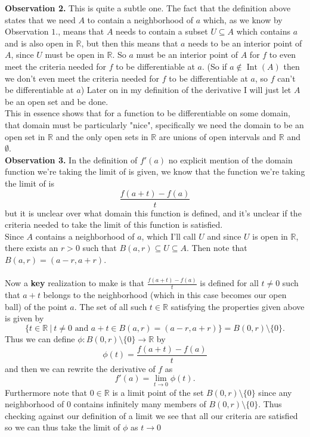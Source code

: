 \documentclass[12pt]{article}
\theoremstyle{definition}
\numberwithin{theorem}{subsection}
\numberwithin{corollary}{subsection}
\theoremstyle{remark}
\theoremstyle{point}
\begin{document}
	\textbf{Observation 2.} This is quite a subtle one. The fact that the definition above states that we need $A$ to contain a neighborhood of $a$ which, as we know by Observation $1.$, means that $A$ needs to contain a subset $U \subseteq A$ which contains $a$ and is also open in $\mathbb{R}$, but then this means that $a$ needs to be an interior point of $A$, since $U$ must be open in $\mathbb{R}$. So $a$ must be an interior point of $A$ for $f$ to even meet the criteria needed for $f$ to be differentiable at $a$. (So if $a\not\in \operatorname{Int}(A)$ then we don't even meet the criteria needed for $f$ to be differentiable at $a$, so $f$ can't be differentiable at $a$) Later on in my definition of the derivative I will just let $A$ be an open set and be done. \\
	
	This in essence shows that for a function to be differentiable on some domain, that domain must be particularly "nice", specifically we need the domain to be an open set in $\mathbb{R}$ and the only open sets in $\mathbb{R}$ are unions of open intervals and $\mathbb{R}$ and $\emptyset$. \\ 
		
	\textbf{Observation 3.} In the definition of $f'(a)$ no explicit mention of the domain function we're taking the limit of is given, we know that the function we're taking the limit of is $$\frac{f(a+t) - f(a)}{t}$$ but it is unclear over what domain this function is defined, and it's unclear if the criteria needed to take the limit of this function is satisfied. \\
	
	Since $A$ contains a neighborhood of $a$, which I'll call $U$ and since $U$ is open in $\mathbb{R}$, there exists an $r > 0$ such that $B(a, r) \subseteq U \subseteq A$.  Then note that $B(a, r) = (a-r, a+r)$. \\ \\ Now a \textbf{key} realization to make is that $\frac{f(a+t) - f(a)}{t}$ is defined for all $t \neq 0$ such that $a + t$ belongs to the neighborhood (which in this case becomes our open ball) of the point $a$. 
	The set of all such $t \in \mathbb{R}$ satisfying the properties given above is given by $$\{t \in \mathbb{R} \ | \  t\neq 0 \text{ and } a+t \in B(a, r) = (a-r, a+r)\} = B(0, r) \setminus \{0\}.$$ Thus we can define $\phi : B(0, r) \setminus \{0\} \to \mathbb{R}$ by $$\phi(t) = \frac{f(a+t) - f(a)}{t}$$ and then we can rewrite the derivative of $f$ as $$f'(a) = \lim_{t \to 0} \phi(t).$$ Furthermore note that $0 \in \mathbb{R}$ is a limit point of the set $B(0, r) \setminus \{0\}$ since any neighborhood of $0$ contains infinitely many members of $B(0, r) \setminus \{0\}$. Thus checking against our definition of a limit we see that all our criteria are satisfied so we can thus take the limit of $\phi$ as $t \to 0$\\
	
\end{document}
